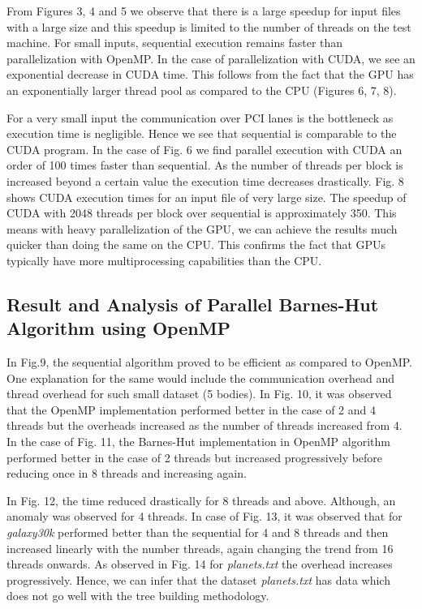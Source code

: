 \documentclass[letterpaper, 10 pt, conference]{ieeeconf}
\begin{document}
    From Figures 3, 4 and 5 we observe that there is a large speedup for input files with a large size and this speedup is limited to the number of threads on the test machine. For small inputs, sequential execution remains faster than parallelization with OpenMP. In the case of parallelization with CUDA, we see an exponential decrease in CUDA time. This follows from the fact that the GPU has an exponentially larger thread pool as compared to the CPU (Figures 6, 7, 8). \par

    For a very small input the communication over PCI lanes is the bottleneck as execution time is negligible. Hence we see that sequential is comparable to the CUDA program. In the case of Fig. 6 we find parallel execution with CUDA an order of 100 times faster than sequential. As the number of threads per block is increased beyond a certain value the execution time decreases drastically. Fig. 8 shows CUDA execution times for an input file of very large size. The speedup of CUDA with 2048 threads per block over sequential is approximately 350. This means with heavy parallelization of the GPU, we can achieve the results much quicker than doing the same on the CPU. This confirms the fact that GPUs typically have more multiprocessing capabilities than the CPU.

    \subsection{Result and Analysis of Parallel Barnes-Hut Algorithm using OpenMP}

    In Fig.9, the sequential algorithm proved to be efficient as compared to OpenMP. One explanation for the same would include the communication overhead and thread overhead for such small dataset (5 bodies). In Fig. 10, it was observed that the OpenMP implementation performed better in the case of 2 and 4 threads but the overheads increased as the number of threads increased from 4. In the case of Fig. 11, the Barnes-Hut implementation in OpenMP algorithm performed better in the case of 2 threads but increased progressively before reducing once in 8 threads and increasing again. \par

    In Fig. 12, the time reduced drastically for 8 threads and above. Although, an anomaly was observed for 4 threads. In case of Fig. 13, it was observed that for \textit{galaxy30k} performed better than the sequential for 4 and 8 threads and then increased linearly with the number threads, again changing the trend from 16 threads onwards. As observed in Fig. 14 for \textit{planets.txt} the overhead increases progressively. Hence, we can infer that the dataset \textit{planets.txt} has data which does not go well with the tree building methodology. \par
\end{document}
